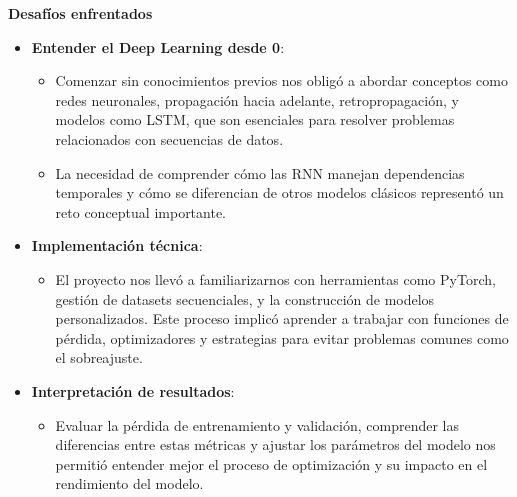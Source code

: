 \documentclass{article}
\begin{document}
{\Large{\textbf{Desafíos enfrentados}}}
\begin{itemize}
    \item \textbf{Entender el Deep Learning desde 0}:
    \begin{itemize}
        \item Comenzar sin conocimientos previos nos obligó a abordar conceptos como redes neuronales, propagación hacia adelante, retropropagación, y modelos como LSTM, que son esenciales para resolver problemas relacionados con secuencias de datos.
        \item La necesidad de comprender cómo las RNN manejan dependencias temporales y cómo se diferencian de otros modelos clásicos representó un reto conceptual importante.
    \end{itemize}
    \item \textbf{Implementación técnica}:
    \begin{itemize}
        \item El proyecto nos llevó a familiarizarnos con herramientas como PyTorch, gestión de datasets secuenciales, y la construcción de modelos personalizados. Este proceso implicó aprender a trabajar con funciones de pérdida, optimizadores y estrategias para evitar problemas comunes como el sobreajuste.
    \end{itemize}
    \item \textbf{Interpretación de resultados}:
    \begin{itemize}
        \item Evaluar la pérdida de entrenamiento y validación, comprender las diferencias entre estas métricas y ajustar los parámetros del modelo nos permitió entender mejor el proceso de optimización y su impacto en el rendimiento del modelo.
    \end{itemize}
\end{itemize}

\newpage
\end{document}
